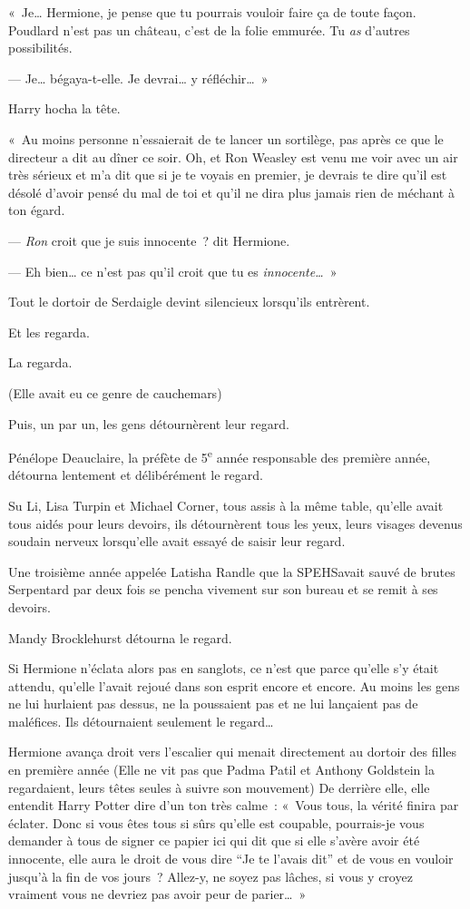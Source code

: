 «~Je… Hermione, je pense que tu pourrais vouloir faire ça de toute façon. Poudlard n'est pas un château, c'est de la folie emmurée. Tu \emph{as} d'autres possibilités.

--- Je… bégaya-t-elle. Je devrai… y réfléchir…~»

Harry hocha la tête.

«~Au moins personne n'essaierait de te lancer un sortilège, pas après ce que le directeur a dit au dîner ce soir. Oh, et Ron Weasley est venu me voir avec un air très sérieux et m'a dit que si je te voyais en premier, je devrais te dire qu'il est désolé d'avoir pensé du mal de toi et qu'il ne dira plus jamais rien de méchant à ton égard.

--- \emph{Ron} croit que je suis innocente~? dit Hermione.

--- Eh bien… ce n'est pas qu'il croit que tu es \emph{innocente…}~»

\later

Tout le dortoir de Serdaigle devint silencieux lorsqu'ils entrèrent.

Et les regarda.

La regarda.

(Elle avait eu ce genre de cauchemars)

Puis, un par un, les gens détournèrent leur regard.

Pénélope Deauclaire, la préfète de 5\textsuperscript{e} année responsable des première année, détourna lentement et délibérément le regard.

Su Li, Lisa Turpin et Michael Corner, tous assis à la même table, qu'elle avait tous aidés pour leurs devoirs, ils détournèrent tous les yeux, leurs visages devenus soudain nerveux lorsqu'elle avait essayé de saisir leur regard.

Une troisième année appelée Latisha Randle que la SPEHSavait sauvé de brutes Serpentard par deux fois se pencha vivement sur son bureau et se remit à ses devoirs.

Mandy Brocklehurst détourna le regard.

Si Hermione n'éclata alors pas en sanglots, ce n'est que parce qu'elle s'y était attendu, qu'elle l'avait rejoué dans son esprit encore et encore. Au moins les gens ne lui hurlaient pas dessus, ne la poussaient pas et ne lui lançaient pas de maléfices. Ils détournaient seulement le regard…

Hermione avança droit vers l'escalier qui menait directement au dortoir des filles en première année (Elle ne vit pas que Padma Patil et Anthony Goldstein la regardaient, leurs têtes seules à suivre son mouvement) De derrière elle, elle entendit Harry Potter dire d'un ton très calme~: «~Vous tous, la vérité finira par éclater. Donc si vous êtes tous si sûrs qu'elle est coupable, pourrais-je vous demander à tous de signer ce papier ici qui dit que si elle s'avère avoir été innocente, elle aura le droit de vous dire “Je te l'avais dit” et de vous en vouloir jusqu'à la fin de vos jours~? Allez-y, ne soyez pas lâches, si vous y croyez vraiment vous ne devriez pas avoir peur de parier…~»

